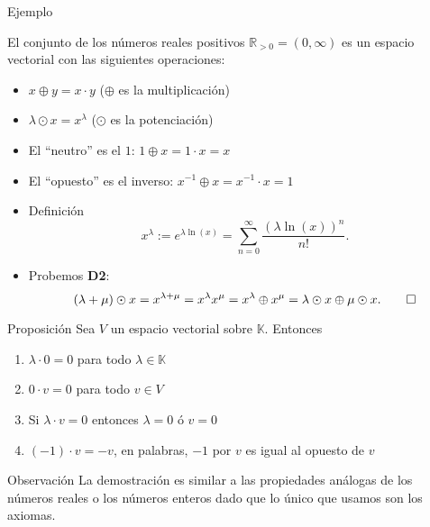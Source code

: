 \documentclass[handout]{beamer} %
\newcommand{\R}{\mathbb R}
\newcommand{\K}{\mathbb K}
\begin{document}
\begin{frame}

\begin{block}{Ejemplo}

El conjunto de los números reales positivos
$\R_{>0}=(0,\infty)$ es un espacio vectorial con las siguientes operaciones:
\begin{itemize}
    \item $x\oplus y=x\cdot y$ ($\oplus$ es la multiplicación)
    \item $\lambda\odot x=x^\lambda$ ($\odot$ es la potenciación)


    \item El ``neutro'' es el $1$: $1\oplus x=1\cdot x=x$
    \item El ``opuesto'' es el inverso: $x^{-1}\oplus x=x^{-1}\cdot x=1$
\end{itemize}
\end{block}
\pause
\begin{observacion}
    \begin{itemize}
        \item Definición  
        $$x^\lambda := e^{\lambda\ln(x)} = \sum_{n=0}^\infty \frac{(\lambda\ln(x))^n}{n!}.$$
        \item Probemos \textbf{D2}: \pause
        $$ (\lambda + \mu )\odot x = x^{\lambda + \mu} = x^{\lambda}x^{\mu} = 
        x^{\lambda}\oplus x^{\mu} =  \lambda\odot x \oplus \mu\odot x.\qed
        $$
    \end{itemize}
    
\end{observacion}
\end{frame}


\begin{frame}
\begin{block}{Proposición}
Sea $V$ un espacio vectorial sobre $\K$. Entonces\pause
\begin{enumerate}
    \item $\lambda\cdot 0=0$ para todo $\lambda\in \K$\pause
    \item $0\cdot v=0$ para todo $v\in V$\pause
    \item Si $\lambda\cdot v=0$ entonces $\lambda=0$ ó $v=0$\pause
    \item $(-1)\cdot v=-v$, en palabras, $-1$ por $v$ es igual al opuesto de $v$
\end{enumerate}
\end{block}
\pause
\begin{block}{Observación}
La demostración es similar  a las propiedades análogas de los números reales  o los números enteros dado que lo único que usamos son los axiomas.
\end{block}

\end{frame}
\end{document}
